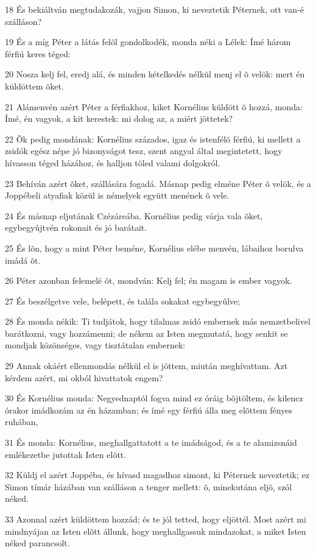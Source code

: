\par 18 És bekiáltván megtudakozák, vajjon Simon, ki neveztetik Péternek, ott van-é szálláson?
\par 19 És a míg Péter a látás felõl gondolkodék, monda néki a Lélek: Ímé három férfiú keres téged:
\par 20 Nosza kelj fel, eredj alá, és minden kételkedés nélkül menj el õ velök: mert én küldöttem õket.
\par 21 Alámenvén azért Péter a férfiakhoz, kiket Kornélius küldött õ hozzá, monda: Ímé, én vagyok, a kit kerestek: mi dolog az, a miért jöttetek?
\par 22 Õk pedig mondának: Kornélius százados, igaz és istenfélõ férfiú, ki mellett a zsidók egész népe jó bizonyságot tesz, szent angyal által megintetett, hogy hívasson téged házához, és halljon tõled valami dolgokról.
\par 23 Behíván azért õket, szállására fogadá. Másnap pedig elméne Péter õ velök, és a Joppébeli atyafiak közül is némelyek együtt menének õ vele.
\par 24 És másnap eljutának Czézáreába. Kornélius pedig várja vala õket, egybegyûjtvén rokonait és jó barátait.
\par 25 És lõn, hogy a mint Péter beméne, Kornélius elébe menvén, lábaihoz borulva imádá õt.
\par 26 Péter azonban felemelé õt, mondván: Kelj fel; én magam is ember vagyok.
\par 27 És beszélgetve vele, belépett, és talála sokakat egybegyûlve;
\par 28 És monda nékik: Ti tudjátok, hogy tilalmas zsidó embernek más nemzetbelivel barátkozni, vagy hozzámenni; de nékem az Isten megmutatá, hogy senkit se mondjak közönséges, vagy tisztátalan embernek:
\par 29 Annak okáért ellenmondás nélkül el is jöttem, miután meghívattam. Azt kérdem azért, mi okból hivattatok engem?
\par 30 És Kornélius monda: Negyednaptól fogva mind ez óráig bõjtöltem, és kilencz órakor imádkozám az én házamban; és ímé egy férfiú álla meg elõttem fényes ruhában,
\par 31 És monda: Kornélius, meghallgattatott a te imádságod, és a te alamizsnáid emlékezetbe jutottak Isten elõtt.
\par 32 Küldj el azért Joppéba, és hívasd magadhoz simont, ki Péternek neveztetik; ez Simon tímár házában van szálláson a tenger mellett: õ, minekutána eljõ, szól néked.
\par 33 Azonnal azért küldöttem hozzád; és te jól tetted, hogy eljöttél. Most azért mi mindnyájan az Isten elõtt állunk, hogy meghallgassuk mindazokat, a miket Isten néked parancsolt.

